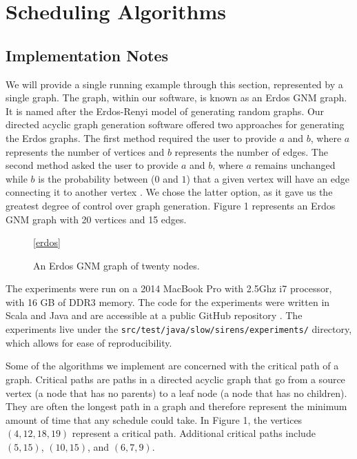 \documentclass[11pt, oneside]{article}   	%
\def\code#1{\texttt{#1}}
\begin{document}
\section{Scheduling Algorithms}

\subsection{Implementation Notes}

We will provide a single running example through this section, represented by a single graph. The graph, within our software, is known as an Erdos GNM graph. It is named after the Erdos-Renyi model of generating random graphs\cite{erdos}. Our directed acyclic graph generation software offered two approaches for generating the Erdos graphs. The first method required the user to provide $a$ and $b$, where $a$ represents the number of vertices and $b$ represents the number of edges. The second method asked the user to provide $a$ and $b$, where $a$ remains unchanged while $b$ is the probability between ($0$ and $1$) that a given vertex will have an edge connecting it to another vertex \cite{ggen}. We chose the latter option, as it gave us the greatest degree of control over graph generation. Figure 1 represents an Erdos GNM graph with 20 vertices and 15 edges.

\begin{figure}
\ref{erdos}
\center
\caption{An Erdos GNM graph of twenty nodes.}
\end{figure}

The experiments were run on a 2014 MacBook Pro with 2.5Ghz i7 processor, with 16 GB of DDR3 memory. The  code for the experiments were written in Scala and Java and are accessible at a public GitHub repository \cite{code}. The experiments live under the \code{src/test/java/slow/sirens/experiments/} directory, which allows for ease of reproducibility.

Some of the algorithms we implement are concerned with the critical path of a graph. Critical paths are paths in a directed acyclic graph that go from a source vertex (a node that has no parents) to a leaf node (a node that has no children). They are often the longest path in a graph and therefore represent the minimum amount of time that any schedule could take. In Figure 1, the vertices $(4, 12, 18, 19)$ represent a critical path. Additional critical paths include $(5, 15)$, $(10, 15)$, and $(6, 7, 9)$.
\end{document}
